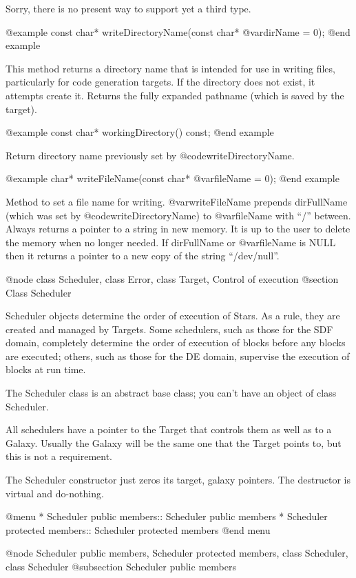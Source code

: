 Sorry, there is no present way to support yet a third type.

@example
const char* writeDirectoryName(const char* @var{dirName} = 0);
@end example

This method returns a directory name that is intended for
use in writing files, particularly for code generation targets.
If the directory does not exist, it attempts create it.
Returns the fully expanded pathname (which is saved by
the target).

@example
const char* workingDirectory() const;
@end example

Return directory name previously set by @code{writeDirectoryName}.

@example
char* writeFileName(const char* @var{fileName} = 0);
@end example

Method to set a file name for writing.  @var{writeFileName} prepends
dirFullName (which was set by @code{writeDirectoryName}) to
@var{fileName} with ``/'' between.  Always returns a pointer to a string
in new memory.  It is up to the user to delete the memory when no longer
needed.  If dirFullName or @var{fileName} is NULL then it returns a pointer to
a new copy of the string ``/dev/null''.

@node class Scheduler, class Error, class Target, Control of execution
@section Class Scheduler

Scheduler objects determine the order of execution of Stars.  As a rule,
they are created and managed by Targets.  Some schedulers, such as those
for the SDF domain, completely determine the order of execution of
blocks before any blocks are executed; others, such as those for the
DE domain, supervise the execution of blocks at run time.

The Scheduler class is an abstract base class; you can't have an object
of class Scheduler.

All schedulers have a pointer to the Target that controls them as well
as to a Galaxy.  Usually the Galaxy will be the same one that the
Target points to, but this is not a requirement.

The Scheduler constructor just zeros its target, galaxy pointers.  The
destructor is virtual and do-nothing.

@menu
* Scheduler public members::    Scheduler public members
* Scheduler protected members::  Scheduler protected members
@end menu

@node Scheduler public members, Scheduler protected members, class Scheduler, class Scheduler
@subsection Scheduler public members

